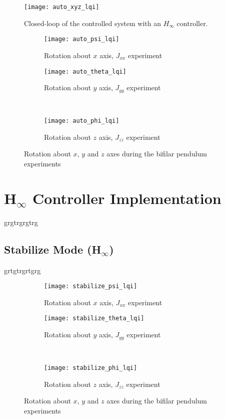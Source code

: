 \begin{figure}[h]
	\begin{center}
	\texttt{[image: auto\_xyz\_lqi]}
	\caption{Closed-loop of the controlled system with an $H_{\infty}$ controller.}
	\label{fig:auto_xyz_lqi1}
	\end{center}
	\end{figure}
	
\begin{figure}[H]
\begin{subfigure}{.5\linewidth}
\centering
\texttt{[image: auto\_psi\_lqi]}
\caption{Rotation about $x$ axis, $J_{xx}$ experiment}
\label{fig:auto_psi_lqi1}
\end{subfigure}%
\begin{subfigure}{.5\linewidth}
\centering
\texttt{[image: auto\_theta\_lqi]}
\caption{Rotation about $y$ axis, $J_{yy}$ experiment}
\label{fig:auto_theta_lqi1}
\end{subfigure}\\[1ex]
\begin{subfigure}{\linewidth}
\centering
\texttt{[image: auto\_phi\_lqi]}
\caption{Rotation about $z$ axis, $J_{zz}$ experiment}
\label{fig:auto_psi_lqi1}
\end{subfigure}
\caption{Rotation about $x$, $y$ and $z$ axes during the bifilar pendulum experiments}
\label{fig:auto_lqi1}
\end{figure}



\section{H$_\infty$ Controller Implementation}
grgtrgrgtrg

\subsection{Stabilize Mode (H$_\infty$)}
grtgtrgrtgrg

\begin{figure}[H]
\begin{subfigure}{.5\linewidth}
\centering
\texttt{[image: stabilize\_psi\_lqi]}
\caption{Rotation about $x$ axis, $J_{xx}$ experiment}
\label{fig:stabilize_psi_lqi2}
\end{subfigure}%
\begin{subfigure}{.5\linewidth}
\centering
\texttt{[image: stabilize\_theta\_lqi]}
\caption{Rotation about $y$ axis, $J_{yy}$ experiment}
\label{fig:stabilize_theta_lqi2}
\end{subfigure}\\[1ex]
\begin{subfigure}{\linewidth}
\centering
\texttt{[image: stabilize\_phi\_lqi]}
\caption{Rotation about $z$ axis, $J_{zz}$ experiment}
\label{fig:stabilize_psi_lqi2}
\end{subfigure}
\caption{Rotation about $x$, $y$ and $z$ axes during the bifilar pendulum experiments}
\label{fig:stabilize_lqi2}
\end{figure}

